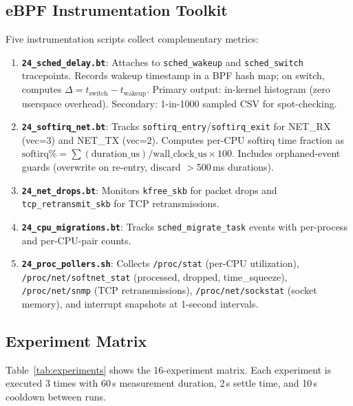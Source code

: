 \documentclass[11pt,a4paper]{article}
\begin{document}
\subsection{eBPF Instrumentation Toolkit}

Five instrumentation scripts collect complementary metrics:

\begin{enumerate}[leftmargin=*]
  \item \textbf{\texttt{24\_sched\_delay.bt}}: Attaches to \texttt{sched\_wakeup} and \texttt{sched\_switch} tracepoints. Records wakeup timestamp in a BPF hash map; on switch, computes $\Delta = t_{\text{switch}} - t_{\text{wakeup}}$. Primary output: in-kernel histogram (zero userspace overhead). Secondary: 1-in-1000 sampled CSV for spot-checking.

  \item \textbf{\texttt{24\_softirq\_net.bt}}: Tracks \texttt{softirq\_entry}/\texttt{softirq\_exit} for NET\_RX (vec=3) and NET\_TX (vec=2). Computes per-CPU softirq time fraction as $\text{softirq\%} = \sum(\text{duration\_us}) / \text{wall\_clock\_us} \times 100$. Includes orphaned-event guards (overwrite on re-entry, discard $>$500\,ms durations).

  \item \textbf{\texttt{24\_net\_drops.bt}}: Monitors \texttt{kfree\_skb} for packet drops and \texttt{tcp\_retransmit\_skb} for TCP retransmissions.

  \item \textbf{\texttt{24\_cpu\_migrations.bt}}: Tracks \texttt{sched\_migrate\_task} events with per-process and per-CPU-pair counts.

  \item \textbf{\texttt{24\_proc\_pollers.sh}}: Collects \texttt{/proc/stat} (per-CPU utilization), \texttt{/proc/net/softnet\_stat} (processed, dropped, time\_squeeze), \texttt{/proc/net/snmp} (TCP retransmissions), \texttt{/proc/net/sockstat} (socket memory), and interrupt snapshots at 1-second intervals.
\end{enumerate}

\subsection{Experiment Matrix}

Table~\ref{tab:experiments} shows the 16-experiment matrix. Each experiment is executed 3 times with 60\,s measurement duration, 2\,s settle time, and 10\,s cooldown between runs.
\end{document}
